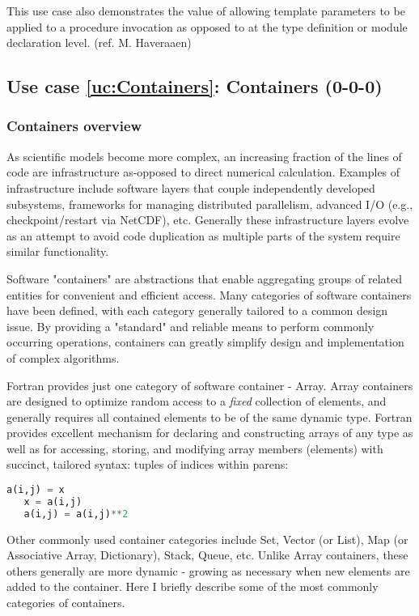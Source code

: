\documentclass{article}
\newcounter{usecase}
\newcommand{\newusecase}[2]{
\refstepcounter{usecase}\label{uc:#1}
\subsection{Use case \ref{uc:#1}: #1 (#2)}}
\begin{document}
This use case also demonstrates the value of allowing template parameters to be applied to a procedure invocation as opposed to at the type definition or module declaration level.  (ref. M. Haveraaen) 





\newusecase{Containers}{0-0-0}

\subsubsection{Containers overview}

 As scientific models become more complex, an increasing fraction of
   the lines of code are infrastructure as-opposed to direct
   numerical calculation.  Examples of infrastructure include software
   layers that couple independently developed subsystems, frameworks
   for managing distributed parallelism, advanced I/O (e.g.,
   checkpoint/restart via NetCDF), etc.  Generally these
   infrastructure layers evolve as an attempt to avoid code
   duplication as multiple parts of the system require similar
   functionality.

 Software "containers" are abstractions that enable aggregating groups of related entities for convenient and efficient access.   Many categories of software containers have been defined, with each   category generally tailored to a common design issue.  By providing a   "standard" and reliable means to perform commonly occurring   operations, containers can greatly simplify design and   implementation of complex algorithms.

Fortran provides just one category of software container - Array.   Array containers are designed to optimize random access to a  {\em fixed} collection of elements, and generally requires all   contained elements to be of the same dynamic type.  Fortran   provides excellent mechanism for declaring and constructing arrays   of any type as well as for accessing, storing, and modifying array    members (elements) with succinct, tailored syntax: tuples of indices within parens:
   
\begin{lstlisting}[language=Python]
   a(i,j) = x
   x = a(i,j)
   a(i,j) = a(i,j)**2
\end{lstlisting}


 Other commonly used container categories include Set, Vector (or   List), Map (or Associative Array, Dictionary), Stack, Queue, etc.   Unlike Array containers, these others generally are more dynamic -   growing as necessary when new elements are added to the container.   Here I briefly describe some of the most commonly categories of   containers.
\end{document}
